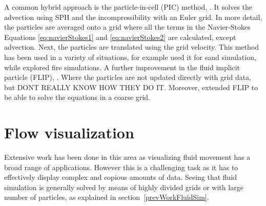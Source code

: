A common hybrid approach is the particle-in-cell (PIC) method, \cite{Harlow1962}.
It solves the advection using SPH and the incompressibility with an Euler grid.
In more detail, the particles are averaged onto a grid where all the terms in the Navier-Stokes Equations \ref{eq:navierStokes1} and \ref{eq:navierStokes2} are calculated, except advection.
Next, the particles are translated using the grid velocity.
This method has been used in a variety of situations, for example \cite{Zhu2005} used it for sand simulation, while \cite{Horvath2009} explored fire simulations.
A further improvement in the fluid implicit particle (FLIP), \cite{J.U.Brackbill1986}.
Where the particles are not updated directly with grid data, but 
DONT REALLY KNOW HOW THEY DO IT.
Moreover, \cite{Raveendran2011} extended FLIP to be able to solve the equations in a coarse grid. 

\section{Flow visualization}


Extensive work has been done in this area as visualizing fluid movement has a broad range of applications.
However this is a challenging task as it has to effectively display complex and copious amounts of data.
Seeing that fluid simulation is generally solved by means of highly divided grids or with large number of particles, as explained in section~\ref{prevWorkFluidSim}.\\


